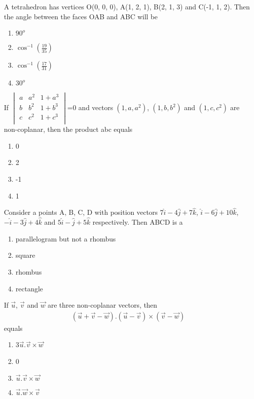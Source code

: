 \item A tetrahedron has vertices O(0, 0, 0), A(1, 2, 1), B(2, 1, 3) and C(-1, 1, 2). Then the angle between the faces OAB and ABC will be
\begin{enumerate}
\item $90^{o}$
\item $\cos^{-1}(\frac{19}{35})$
\item $\cos^{-1}(\frac{17}{31})$
\item $30^{o}$
\end{enumerate}

\item If 
$\begin{vmatrix}
a & a^{2} & 1 + a^{3} \\
b & b^{2} & 1 + b^{3} \\
c & c^{2} & 1 + c^{3} \\
\end{vmatrix}$=0
 and vectors $(1, a, a^{2})$, $(1, b, b^{2})$  and  $(1, c, c^{2})$ are non-coplanar, then the product abc equals
\begin{enumerate}
\item 0
\item 2
\item -1
\item 1
\end{enumerate}

\item Consider a points A, B, C, D with position vectors $7\hat{i} - 4\hat{j} + 7\hat{k}$, $\hat{i} - 6\hat{j} + 10\hat{k}$, $-\hat{i} - 3\hat{j} + 4\hat{k}$ and $5\hat{i} - \hat{j} + 5\hat{k}$ respectively. Then ABCD is a 
\begin{enumerate}
\item parallelogram but not a rhombus
\item square
\item rhombus
\item rectangle
\end{enumerate}

\item If $\overrightarrow{u}$, $\overrightarrow{v}$ and $\overrightarrow{w}$ are three non-coplanar vectors, then 
\begin{align*}
(\overrightarrow{u} + \overrightarrow{v} - \overrightarrow{w}).(\overrightarrow{u}-\overrightarrow{v}) \times (\overrightarrow{v}-\overrightarrow{w})
\end{align*}
equals
\begin{enumerate}
\item 3$\overrightarrow{u}.\overrightarrow{v} \times \overrightarrow{w}$
\item 0
\item $\overrightarrow{u}.\overrightarrow{v} \times \overrightarrow{w}$
\item $\overrightarrow{u}.\overrightarrow{w} \times \overrightarrow{v}$
\end{enumerate}

